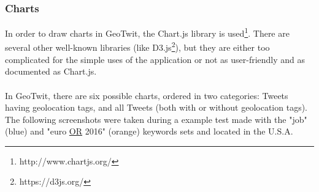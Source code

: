 \documentclass[a4paper,11pt]{report}
\begin{document}
\subsubsection{Charts}
\label{charts}
In order to draw charts in GeoTwit, the Chart.js library is used\footnote{http://www.chartjs.org/}. There are several other well-known libraries (like D3.js\footnote{https://d3js.org/}), but they are either too complicated for the simple uses of the application or not as user-friendly and as documented as Chart.js.\\\\
In GeoTwit, there are six possible charts, ordered in two categories: Tweets having geolocation tags, and all Tweets (both with or without geolocation tags). The following screenshots were taken during a example test made with the \color{blue}"job" (blue) \color{black}and \color{Orange}"euro \underline{OR} 2016" (orange) \color{black}keywords sets and located in the U.S.A.
\end{document}
